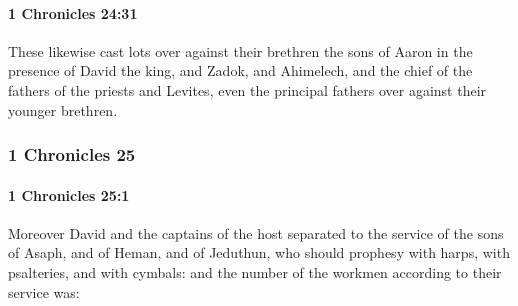 		\paragraph{1 Chronicles 24:31} %
			\label{1CHRONICLES-24-31}

			These likewise cast lots over against their brethren the sons of Aaron in the presence of David the king, and Zadok, and Ahimelech, and the chief of the fathers of the priests and Levites, even the principal fathers over against their younger brethren.

	\subsubsection{1 Chronicles 25} %
		\label{1CHRONICLES-25}

		\paragraph{1 Chronicles 25:1} %
			\label{1CHRONICLES-25-1}

			Moreover David and the captains of the host separated to the service of the sons of Asaph, and of Heman, and of Jeduthun, who should prophesy with harps, with psalteries, and with cymbals: and the number of the workmen according to their service was:

